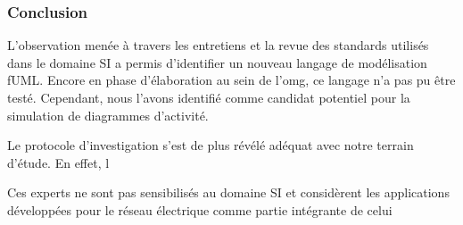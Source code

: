 	\subsubsection{Conclusion}
	

L'observation menée à travers les entretiens et la revue des standards utilisés dans le domaine SI a permis d'identifier un nouveau langage de modélisation fUML. Encore en phase d'élaboration au sein de l'\gls{omg}, ce langage n'a pas pu être testé. Cependant, nous l'avons identifié comme candidat potentiel pour la simulation de diagrammes d'activité.

Le protocole d'investigation s'est de plus révélé adéquat avec notre terrain d'étude. En effet, l

Ces experts ne sont pas sensibilisés au domaine SI et considèrent les applications développées pour le réseau électrique comme partie intégrante de celui 
	
	

